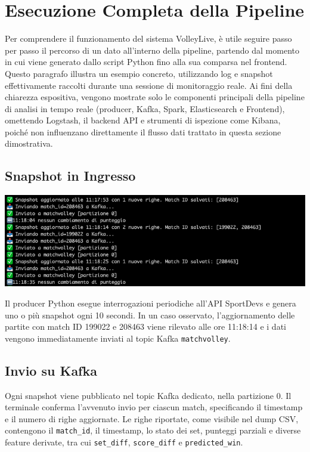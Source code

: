 \documentclass[a4paper,12pt]{report}
\begin{document}
\section{Esecuzione Completa della Pipeline}

Per comprendere il funzionamento del sistema VolleyLive, è utile seguire passo per passo il percorso di un dato all'interno della pipeline, partendo dal momento in cui viene generato dallo script Python fino alla sua comparsa nel frontend. Questo paragrafo illustra un esempio concreto, utilizzando log e snapshot effettivamente raccolti durante una sessione di monitoraggio reale.
Ai fini della chiarezza espositiva, vengono mostrate solo le componenti principali della pipeline di analisi in tempo reale (producer, Kafka, Spark, Elasticsearch e Frontend), omettendo Logstash, il backend API e strumenti di ispezione come Kibana, poiché non influenzano direttamente il flusso dati trattato in questa sezione dimostrativa.

\subsection*{Snapshot in Ingresso}

\noindent\begin{minipage}{\textwidth}
  \centering
    \includegraphics[width=\textwidth]{producer.png}
    \label{fig:producer.py}
\end{minipage}
Il producer Python esegue interrogazioni periodiche all’API SportDevs e genera uno o più snapshot ogni 10 secondi. In un caso osservato, l’aggiornamento delle partite con match ID 199022 e 208463 viene rilevato alle ore 11:18:14 e i dati vengono immediatamente inviati al topic Kafka \texttt{matchvolley}.


\subsection*{Invio su Kafka}
Ogni snapshot viene pubblicato nel topic Kafka dedicato, nella partizione 0. Il terminale conferma l’avvenuto invio per ciascun match, specificando il timestamp e il numero di righe aggiornate. Le righe riportate, come visibile nel dump CSV, contengono il \texttt{match\_id}, il timestamp, lo stato dei set, punteggi parziali e diverse feature derivate, tra cui \texttt{set\_diff}, \texttt{score\_diff} e \texttt{predicted\_win}.
\end{document}
